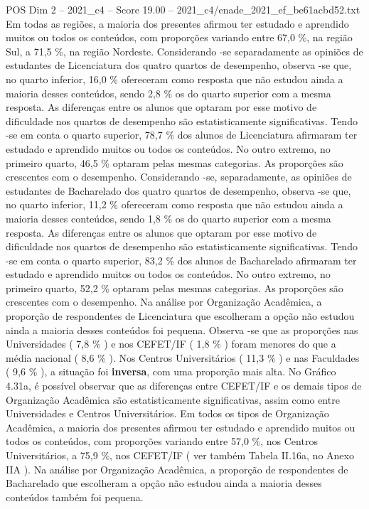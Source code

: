 \begin{textsample}{POS Dim 2 – 2021\_c4 – Score 19.00 – 2021\_c4/enade\_2021\_ef\_be61acbd52.txt}
Em todas as regiões, a maioria dos presentes afirmou ter estudado e aprendido muitos ou todos os conteúdos, com proporções variando entre 67,0 \%, na região Sul, a 71,5 \%, na região Nordeste.
Considerando -se separadamente as opiniões de estudantes de Licenciatura dos quatro quartos de desempenho, observa -se que, no quarto inferior, 16,0 \% ofereceram como resposta que não estudou ainda a maioria desses conteúdos, sendo 2,8 \% os do quarto superior com a mesma resposta.
As diferenças entre os alunos que optaram por esse motivo de dificuldade nos quartos de desempenho são estatisticamente significativas.
Tendo -se em conta o quarto superior, 78,7 \% dos alunos de Licenciatura afirmaram ter estudado e aprendido muitos ou todos os conteúdos.
No outro extremo, no primeiro quarto, 46,5 \% optaram pelas mesmas categorias.
As proporções são crescentes com o desempenho.
Considerando -se, separadamente, as opiniões de estudantes de Bacharelado dos quatro quartos de desempenho, observa -se que, no quarto inferior, 11,2 \% ofereceram como resposta que não estudou ainda a maioria desses conteúdos, sendo 1,8 \% os do quarto superior com a mesma resposta.
As diferenças entre os alunos que optaram por esse motivo de dificuldade nos quartos de desempenho são estatisticamente significativas.
Tendo -se em conta o quarto superior, 83,2 \% dos alunos de Bacharelado afirmaram ter estudado e aprendido muitos ou todos os conteúdos.
No outro extremo, no primeiro quarto, 52,2 \% optaram pelas mesmas categorias.
As proporções são crescentes com o desempenho.
Na análise por Organização Acadêmica, a proporção de respondentes de Licenciatura que escolheram a opção não estudou ainda a maioria desses conteúdos foi pequena.
Observa -se que as proporções nas Universidades ( 7,8 \% ) e nos CEFET/IF ( 1,8 \% ) foram menores do que a média nacional ( 8,6 \% ).
Nos Centros Universitários ( 11,3 \% ) e nas Faculdades ( 9,6 \% ), a situação foi \textbf{inversa}, com uma proporção mais alta.
No Gráfico 4.31a, é possível observar que as diferenças entre CEFET/IF e os demais tipos de Organização Acadêmica são estatisticamente significativas, assim como entre Universidades e Centros Universitários.
Em todos os tipos de Organização Acadêmica, a maioria dos presentes afirmou ter estudado e aprendido muitos ou todos os conteúdos, com proporções variando entre 57,0 \%, nos Centros Universitários, a 75,9 \%, nos CEFET/IF ( ver também Tabela II.16a, no Anexo IIA ).
Na análise por Organização Acadêmica, a proporção de respondentes de Bacharelado que escolheram a opção não estudou ainda a maioria desses conteúdos também foi pequena.

\end{textsample}
